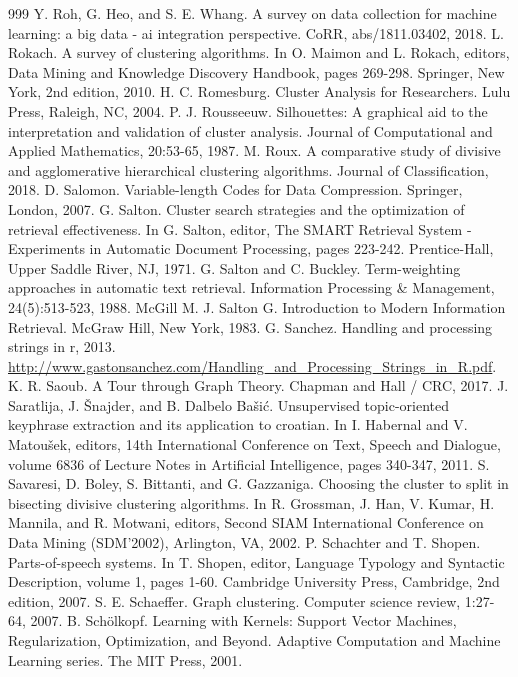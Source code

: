 \documentclass[11pt,openany,executivepaper]{book}
\begin{document}
\begin{thebibliography}{999}
 Y. Roh, G. Heo, and S. E. Whang. A survey on data collection for machine learning: a big data - ai integration perspective. CoRR, abs/1811.03402, 2018.
 L. Rokach. A survey of clustering algorithms. In O. Maimon and L. Rokach, editors, Data Mining and Knowledge Discovery Handbook, pages 269-298. Springer, New York, 2nd edition, 2010.
 H. C. Romesburg. Cluster Analysis for Researchers. Lulu Press, Raleigh, NC, 2004.
 P. J. Rousseeuw. Silhouettes: A graphical aid to the interpretation and validation of cluster analysis. Journal of Computational and Applied Mathematics, 20:53-65, 1987.
 M. Roux. A comparative study of divisive and agglomerative hierarchical clustering algorithms. Journal of Classification, 2018.
 D. Salomon. Variable-length Codes for Data Compression. Springer, London, 2007.
 G. Salton. Cluster search strategies and the optimization of retrieval effectiveness. In G. Salton, editor, The SMART Retrieval System - Experiments in Automatic Document Processing, pages 223-242. Prentice-Hall, Upper Saddle River, NJ, 1971.
 G. Salton and C. Buckley. Term-weighting approaches in automatic text retrieval. Information Processing \& Management, 24(5):513-523, 1988.
 McGill M. J. Salton G. Introduction to Modern Information Retrieval. McGraw Hill, New York, 1983.
 G. Sanchez. Handling and processing strings in r, 2013. \url{http://www.gastonsanchez.com/Handling_and_Processing_Strings_in_R.pdf}.
 K. R. Saoub. A Tour through Graph Theory. Chapman and Hall / CRC, 2017.
 J. Saratlija, J. Šnajder, and B. Dalbelo Bašić. Unsupervised topic-oriented keyphrase extraction and its application to croatian. In I. Habernal and V. Matoušek, editors, 14th International Conference on Text, Speech and Dialogue, volume 6836 of Lecture Notes in Artificial Intelligence, pages 340-347, 2011.
 S. Savaresi, D. Boley, S. Bittanti, and G. Gazzaniga. Choosing the cluster to split in bisecting divisive clustering algorithms. In R. Grossman, J. Han, V. Kumar, H. Mannila, and R. Motwani, editors, Second SIAM International Conference on Data Mining (SDM'2002), Arlington, VA, 2002.
 P. Schachter and T. Shopen. Parts-of-speech systems. In T. Shopen, editor, Language Typology and Syntactic Description, volume 1, pages 1-60. Cambridge University Press, Cambridge, 2nd edition, 2007.
 S. E. Schaeffer. Graph clustering. Computer science review, 1:27-64, 2007.
 B. Schölkopf. Learning with Kernels: Support Vector Machines, Regularization, Optimization, and Beyond. Adaptive Computation and Machine Learning series. The MIT Press, 2001.

\end{thebibliography}
\end{document}
